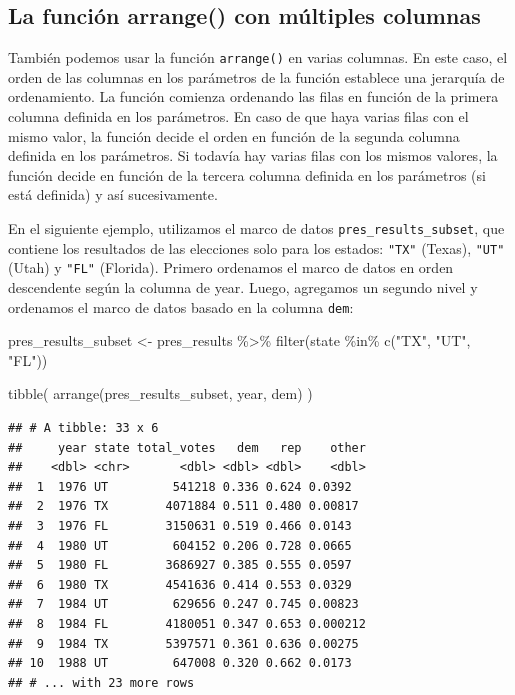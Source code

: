 \documentclass[
]{book}
\newenvironment{Shaded}{\begin{snugshade}}{\end{snugshade}}
\newcommand{\FunctionTok}[1]{\textcolor[rgb]{0.00,0.00,0.00}{#1}}
\newcommand{\NormalTok}[1]{#1}
\newcommand{\OtherTok}[1]{\textcolor[rgb]{0.56,0.35,0.01}{#1}}
\newcommand{\SpecialCharTok}[1]{\textcolor[rgb]{0.00,0.00,0.00}{#1}}
\newcommand{\StringTok}[1]{\textcolor[rgb]{0.31,0.60,0.02}{#1}}
\begin{document}
\hypertarget{la-funciuxf3n-arrange-con-muxfaltiples-columnas}{%
\subsection{La función arrange() con múltiples columnas}\label{la-funciuxf3n-arrange-con-muxfaltiples-columnas}}

También podemos usar la función \texttt{arrange()} en varias columnas. En este caso, el orden de las columnas en los parámetros de la función establece una jerarquía de ordenamiento. La función comienza ordenando las filas en función de la primera columna definida en los parámetros. En caso de que haya varias filas con el mismo valor, la función decide el orden en función de la segunda columna definida en los parámetros. Si todavía hay varias filas con los mismos valores, la función decide en función de la tercera columna definida en los parámetros (si está definida) y así sucesivamente.

En el siguiente ejemplo, utilizamos el marco de datos \texttt{pres\_results\_subset}, que contiene los resultados de las elecciones solo para los estados: \texttt{"TX"} (Texas), \texttt{"UT"} (Utah) y \texttt{"FL"} (Florida). Primero ordenamos el marco de datos en orden descendente según la columna de year. Luego, agregamos un segundo nivel y ordenamos el marco de datos basado en la columna \texttt{dem}:

\begin{Shaded}
\begin{Highlighting}[]
\NormalTok{pres\_results\_subset }\OtherTok{\textless{}{-}}\NormalTok{ pres\_results }\SpecialCharTok{\%\textgreater{}\%}
  \FunctionTok{filter}\NormalTok{(state }\SpecialCharTok{\%in\%} \FunctionTok{c}\NormalTok{(}\StringTok{"TX"}\NormalTok{,}
                      \StringTok{"UT"}\NormalTok{,}
                      \StringTok{"FL"}\NormalTok{))}
\end{Highlighting}
\end{Shaded}

\begin{Shaded}
\begin{Highlighting}[]
\FunctionTok{tibble}\NormalTok{(}
\FunctionTok{arrange}\NormalTok{(pres\_results\_subset, year, dem)}
\NormalTok{)}
\end{Highlighting}
\end{Shaded}

\begin{verbatim}
## # A tibble: 33 x 6
##     year state total_votes   dem   rep    other
##    <dbl> <chr>       <dbl> <dbl> <dbl>    <dbl>
##  1  1976 UT         541218 0.336 0.624 0.0392  
##  2  1976 TX        4071884 0.511 0.480 0.00817 
##  3  1976 FL        3150631 0.519 0.466 0.0143  
##  4  1980 UT         604152 0.206 0.728 0.0665  
##  5  1980 FL        3686927 0.385 0.555 0.0597  
##  6  1980 TX        4541636 0.414 0.553 0.0329  
##  7  1984 UT         629656 0.247 0.745 0.00823 
##  8  1984 FL        4180051 0.347 0.653 0.000212
##  9  1984 TX        5397571 0.361 0.636 0.00275 
## 10  1988 UT         647008 0.320 0.662 0.0173  
## # ... with 23 more rows
\end{verbatim}
\end{document}
